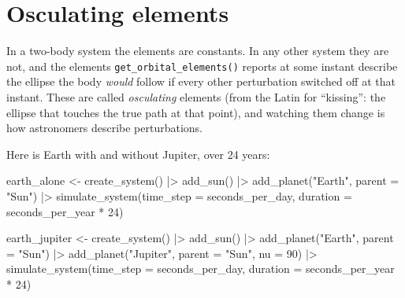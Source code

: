 \documentclass[
  10.5pt,
  letterpaper,
]{scrbook}
\newenvironment{Shaded}{\begin{snugshade}}{\end{snugshade}}
\newcommand{\AttributeTok}[1]{\textcolor[rgb]{0.00,0.00,0.00}{#1}}
\newcommand{\DecValTok}[1]{\textcolor[rgb]{0.00,0.00,0.00}{#1}}
\newcommand{\FunctionTok}[1]{\textcolor[rgb]{0.00,0.00,0.00}{#1}}
\newcommand{\NormalTok}[1]{\textcolor[rgb]{0.00,0.00,0.00}{#1}}
\newcommand{\OtherTok}[1]{\textcolor[rgb]{0.00,0.00,0.00}{#1}}
\newcommand{\SpecialCharTok}[1]{\textcolor[rgb]{0.00,0.00,0.00}{#1}}
\newcommand{\StringTok}[1]{\textcolor[rgb]{0.00,0.00,0.00}{#1}}
\theoremstyle{plain}
\theoremstyle{remark}
\begin{document}
\section{Osculating elements}\label{osculating-elements}

In a two-body system the elements are constants. In any other system
they are not, and the elements \texttt{get\_orbital\_elements()} reports
at some instant describe the ellipse the body \emph{would} follow if
every other perturbation switched off at that instant. These are called
\emph{osculating} elements (from the Latin for ``kissing'': the ellipse
that touches the true path at that point), and watching them change is
how astronomers describe perturbations.

Here is Earth with and without Jupiter, over 24 years:

\begin{Shaded}
\begin{Highlighting}[]
\NormalTok{earth\_alone }\OtherTok{\textless{}{-}} \FunctionTok{create\_system}\NormalTok{() }\SpecialCharTok{|\textgreater{}}
  \FunctionTok{add\_sun}\NormalTok{() }\SpecialCharTok{|\textgreater{}}
  \FunctionTok{add\_planet}\NormalTok{(}\StringTok{"Earth"}\NormalTok{, }\AttributeTok{parent =} \StringTok{"Sun"}\NormalTok{) }\SpecialCharTok{|\textgreater{}}
  \FunctionTok{simulate\_system}\NormalTok{(}\AttributeTok{time\_step =}\NormalTok{ seconds\_per\_day, }\AttributeTok{duration =}\NormalTok{ seconds\_per\_year }\SpecialCharTok{*} \DecValTok{24}\NormalTok{)}

\NormalTok{earth\_jupiter }\OtherTok{\textless{}{-}} \FunctionTok{create\_system}\NormalTok{() }\SpecialCharTok{|\textgreater{}}
  \FunctionTok{add\_sun}\NormalTok{() }\SpecialCharTok{|\textgreater{}}
  \FunctionTok{add\_planet}\NormalTok{(}\StringTok{"Earth"}\NormalTok{,   }\AttributeTok{parent =} \StringTok{"Sun"}\NormalTok{) }\SpecialCharTok{|\textgreater{}}
  \FunctionTok{add\_planet}\NormalTok{(}\StringTok{"Jupiter"}\NormalTok{, }\AttributeTok{parent =} \StringTok{"Sun"}\NormalTok{, }\AttributeTok{nu =} \DecValTok{90}\NormalTok{) }\SpecialCharTok{|\textgreater{}}
  \FunctionTok{simulate\_system}\NormalTok{(}\AttributeTok{time\_step =}\NormalTok{ seconds\_per\_day, }\AttributeTok{duration =}\NormalTok{ seconds\_per\_year }\SpecialCharTok{*} \DecValTok{24}\NormalTok{)}
\end{Highlighting}
\end{Shaded}
\end{document}
